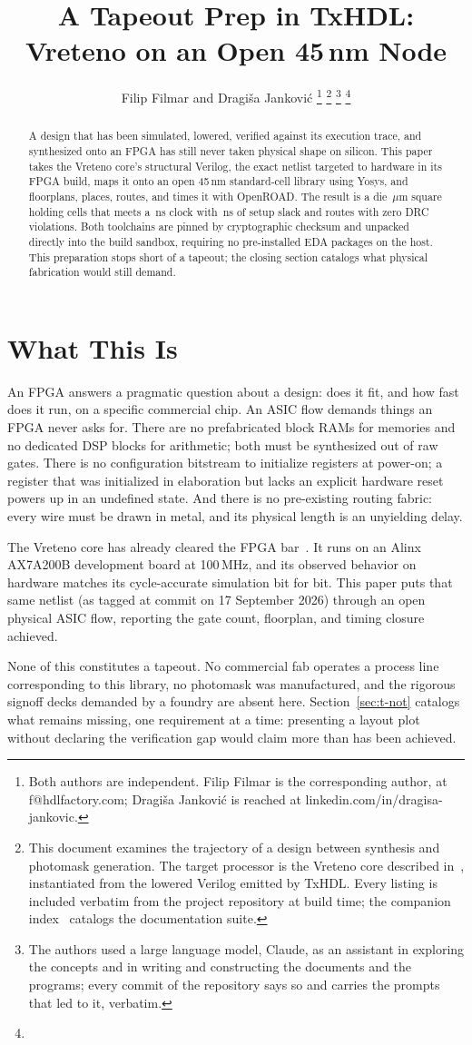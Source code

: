 \documentclass[journal,9pt]{IEEEtran}
\title{A Tapeout Prep in TxHDL: Vreteno on an Open 45\,nm Node}
\author{Filip Filmar and Dragiša Janković%
\thanks{Both authors are independent. Filip Filmar is the
corresponding author, at f@hdlfactory.com; Dragiša Janković is
reached at linkedin.com/in/dragisa-jankovic.}%
\thanks{This document examines the trajectory of a design between
synthesis and photomask generation. The target processor is the Vreteno
core described in~\cite{vreteno}, instantiated from the lowered Verilog
emitted by TxHDL. Every listing is included verbatim from the project
repository \code{HDL/txhdl} at build time; the companion
index~\cite{cover} catalogs the documentation suite.}%
\thanks{The authors used a large language model, Claude, as an
assistant in exploring the concepts and in writing and constructing
the documents and the programs; every commit of the repository says
so and carries the prompts that led to it, verbatim.}%
\thanks{\buildstamp}}
\begin{document}
\maketitle

\begin{abstract}
A design that has been simulated, lowered, verified against its execution
trace, and synthesized onto an FPGA has still never taken physical shape
on silicon. This paper takes the Vreteno core's structural Verilog, the
exact netlist targeted to hardware in its FPGA build, maps it onto an open
45\,nm standard-cell library using Yosys, and floorplans, places, routes,
and times it with OpenROAD. The result is a die \asicdie\,$\mu$m square
holding \asiccells{} cells that meets a \asicperiod\,ns clock with
\asicslack\,ns of setup slack and routes with zero DRC violations.
Both toolchains are pinned by cryptographic checksum and unpacked
directly into the build sandbox, requiring no pre-installed EDA packages
on the host. This preparation stops short of a tapeout; the closing
section catalogs what physical fabrication would still demand.
\end{abstract}

\section{What This Is}
\label{sec:t-what}

An FPGA answers a pragmatic question about a design: does it fit, and
how fast does it run, on a specific commercial chip. An ASIC flow
demands things an FPGA never asks for. There are no prefabricated block
RAMs for memories and no dedicated DSP blocks for arithmetic; both must
be synthesized out of raw gates. There is no configuration bitstream to
initialize registers at power-on; a register that was initialized in
elaboration but lacks an explicit hardware reset powers up in an
undefined state. And there is no pre-existing routing fabric: every wire
must be drawn in metal, and its physical length is an unyielding delay.

The Vreteno core has already cleared the FPGA bar~\cite{vreteno}. It runs
on an Alinx AX7A200B development board at 100\,MHz, and its observed
behavior on hardware matches its cycle-accurate simulation bit for
bit. This paper puts that same netlist (as tagged at commit
 on 17 September 2026) through an open physical ASIC flow,
reporting the gate count, floorplan, and timing closure achieved.

None of this constitutes a tapeout. No commercial fab operates a process
line corresponding to this library, no photomask was manufactured, and
the rigorous signoff decks demanded by a foundry are absent here.
Section~\ref{sec:t-not} catalogs what remains missing, one requirement
at a time: presenting a layout plot without declaring the verification
gap would claim more than has been achieved.
\end{document}
